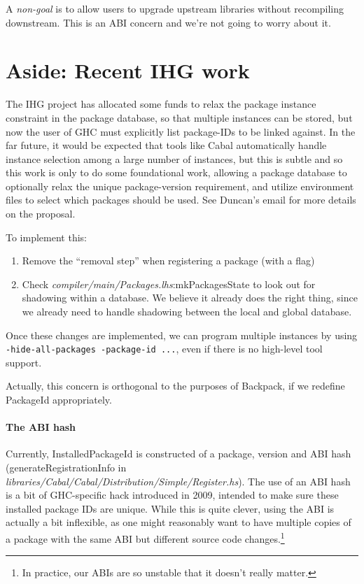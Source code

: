 \documentclass{article}
\newcommand{\ghcfile}[1]{\textsl{#1}}
\begin{document}
A \emph{non-goal} is to allow users to upgrade upstream libraries
without recompiling downstream. This is an ABI concern and we're not
going to worry about it.

\section{Aside: Recent IHG work}\label{sec:ihg}

The IHG project has allocated some funds to relax the package instance
constraint in the package database, so that multiple instances can be
stored, but now the user of GHC must explicitly list package-IDs to be
linked against.  In the far future, it would be expected that tools like
Cabal automatically handle instance selection among a large number of
instances, but this is subtle and so this work is only to do some
foundational work, allowing a package database to optionally relax the
unique package-version requirement, and utilize environment files to
select which packages should be used.  See Duncan's email for more
details on the proposal.

To implement this:

\begin{enumerate}

    \item Remove the ``removal step'' when registering a package (with a flag)

    \item Check \ghcfile{compiler/main/Packages.lhs}:mkPackagesState to look out for shadowing
      within a database. We believe it already does the right thing, since
      we already need to handle shadowing between the local and global database.

\end{enumerate}

Once these changes are implemented, we can program multiple instances by
using \verb|-hide-all-packages -package-id ...|, even if there is no
high-level tool support.

Actually, this concern is orthogonal to the purposes of Backpack, if
we redefine PackageId appropriately.

\paragraph{The ABI hash} Currently, InstalledPackageId
is constructed of a package, version and ABI hash
(generateRegistrationInfo in
\ghcfile{libraries/Cabal/Cabal/Distribution/Simple/Register.hs}).  The
use of an ABI hash is a bit of GHC-specific hack introduced in 2009,
intended to make sure these installed package IDs are unique.  While
this is quite clever, using the ABI is actually a bit inflexible, as one
might reasonably want to have multiple copies of a package with the same
ABI but different source code changes.\footnote{In practice, our ABIs
are so unstable that it doesn't really matter.}
\end{document}
